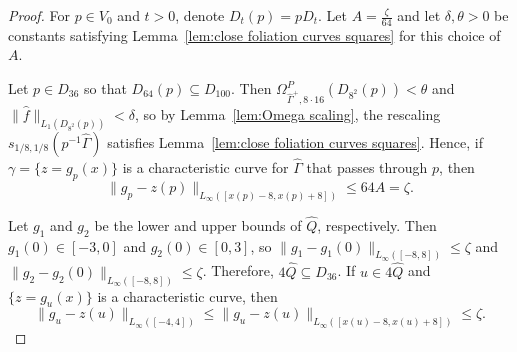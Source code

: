 \documentclass[11pt,reqno]{amsart}
\newcommand{\0}{\mathbf{0}}
\renewcommand{\1}{\mathbf 1}
\renewcommand{\subset}{\subseteq}
\renewcommand{\le}{\leqslant}
\theoremstyle{remark}
\begin{document}
\begin{proof}
  For $p\in V_0$ and $t>0$, denote $D_t(p)=pD_t$.
  Let $A=\frac{\zeta}{64}$ and let $\delta, \theta>0$ be constants satisfying Lemma~\ref{lem:close foliation curves squares} for this choice of $A$.

  Let $p\in D_{36}$ so that $D_{64}(p)\subset D_{100}$.
  Then $\Omega^P_{\hat{\Gamma}^+,8\cdot 16}(D_{8^2}(p)) < \theta$ and $\|\hat{f}\|_{L_1(D_{8^2}(p))} < \delta$, so by Lemma~\ref{lem:Omega scaling}, the rescaling $s_{1/8,1/8}(p^{-1}\hat{\Gamma})$ satisfies Lemma~\ref{lem:close foliation curves squares}. Hence, if $\gamma=\{z=g_p(x)\}$ is a characteristic curve for $\hat{\Gamma}$ that passes through $p$, then $$\|g_p-z(p)\|_{L_\infty([x(p)-8,x(p)+8])}\le 64 A =\zeta.$$

  Let $g_1$ and $g_2$ be the lower and upper bounds of $\hat{Q}$, respectively.  Then $g_1(0)\in [-3,0]$ and $g_2(0)\in [0,3]$, so $\|g_1-g_1(0)\|_{L_\infty([-8,8])}\le \zeta$ and $\|g_2-g_2(0)\|_{L_\infty([-8,8])}\le \zeta$.  Therefore, $4\hat{Q}\subset D_{36}$.  If $u\in 4 \hat{Q}$ and $\{z=g_u(x)\}$ is a characteristic curve, then
  \begin{equation*}
  \|g_u-z(u)\|_{L_\infty([-4,4])} \le \|g_u-z(u)\|_{L_\infty([x(u)-8,x(u)+8])} \le \zeta.\tag*{\qedhere}
  \end{equation*}
\end{proof}
\end{document}
